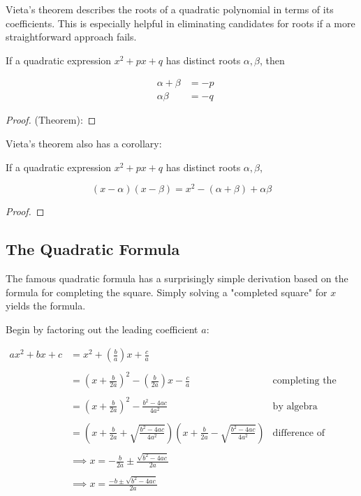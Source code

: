 \documentclass{standalone}
\begin{document}
Vieta's theorem describes the roots of a quadratic polynomial in terms of its
coefficients. This is especially helpful in eliminating candidates for roots if
a more straightforward approach fails.

If a quadratic expression $x^2 + px + q$ has distinct roots $\alpha, \beta$,
then

\begin{align}
  &\alpha + \beta &= -p \\
  &\alpha \beta &= -q
\end{align}

\begin{proof}
  (Theorem):
\end{proof}

Vieta's theorem also has a corollary:

If a quadratic expression $x^2 + px + q$ has distinct roots $\alpha, \beta$,

\[
  (x - \alpha)(x - \beta) = x^2 - (\alpha + \beta) + \alpha \beta
\]

\begin{proof}
\end{proof}

\subsection{The Quadratic Formula}

The famous quadratic formula has a surprisingly simple derivation based on the
formula for completing the square. Simply solving a "completed square" for $x$
yields the formula.

Begin by factoring out the leading coefficient $a$:

\begin{align*} \label{eqn:quadratic_formula}
  ax^2 + bx + c
  &= x^2 + (\frac b a)x + \frac c a \\\\
  &= (x + \frac b {2a})^2 - (\frac b {2a})x - \frac c a &\text{completing the square} \\\\
  &= (x + \frac b {2a})^2 - \frac {b^2 - 4ac} {4a^2} &\text{by algebra} \\\\
  &= (x + \frac b {2a} + \sqrt{\frac {b^2 - 4ac} {4a^2}})(x + \frac b {2a} - \sqrt{\frac {b^2 - 4ac} {4a^2}}) &\text{difference of squares} \\\\
  &\implies x = -\frac b {2a} \pm \frac{\sqrt{b^2 - 4ac}} {2a} \\\\
  &\implies x = \frac {-b \pm \sqrt{b^2 - 4ac}} {2a}
\end{align*}
\end{document}
